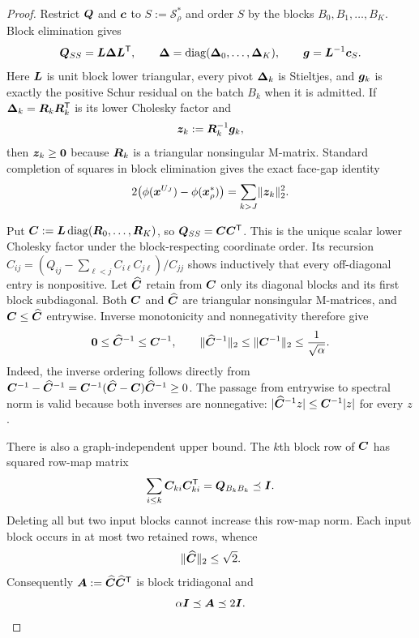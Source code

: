 \begin{proof}
Restrict $\bm{Q}$ and $\bm{c}$ to $S:=\mathcal S_\rho^*$ and order $S$ by the
blocks $B_0,B_1,\ldots,B_K$.  Block elimination gives
\begin{equation}
 \bm{Q}_{SS}=\bm{L}\bm{\Delta}\bm{L}^{\mathsf{T}},
 \qquad
 \bm{\Delta}=\operatorname{diag}(\bm{\Delta}_0,\ldots,\bm{\Delta}_K),
 \qquad
 \bm{g}=\bm{L}^{-1}\bm{c}_S.
 \label{eq:block-ldl}
\end{equation}
Here $\bm{L}$ is unit block lower triangular, every pivot
$\bm{\Delta}_k$ is Stieltjes, and $\bm{g}_k$ is exactly the positive Schur residual
on the batch $B_k$ when it is admitted.  If
$\bm{\Delta}_k=\bm{R}_k\bm{R}_k^{\mathsf{T}}$ is its lower Cholesky factor and
\begin{equation}
 \bm{z}_k:=\bm{R}_k^{-1}\bm{g}_k,
 \label{eq:block-z}
\end{equation}
then $\bm{z}_k\geq\bm{0}$ because $\bm{R}_k$ is a triangular nonsingular
M-matrix.  Standard completion of squares in block elimination gives the
exact face-gap identity
\begin{equation}
 2\bigl(\phi(\bm{x}^{U_J})-\phi(\bm{x}_\rho^*)\bigr)
 =\sum_{k>J}\lVert\bm{z}_k\rVert_2^2.
 \label{eq:block-gap-identity}
\end{equation}

Put $\bm{C}:=\bm{L}\operatorname{diag}(\bm{R}_0,\ldots,\bm{R}_K)$, so
$\bm{Q}_{SS}=\bm{C}\bm{C}^{\mathsf{T}}$.  This is the unique scalar lower Cholesky factor
under the block-respecting coordinate order.  Its recursion
$C_{ij}=(Q_{ij}-\sum_{\ell<j}C_{i\ell}C_{j\ell})/C_{jj}$ shows inductively
that every off-diagonal entry is nonpositive.  Let
$\widehat{\bm{C}}$ retain from $\bm{C}$ only its diagonal blocks and its first block
subdiagonal.  Both $\bm{C}$ and $\widehat{\bm{C}}$ are triangular nonsingular
M-matrices, and $\bm{C}\leq\widehat{\bm{C}}$ entrywise.  Inverse monotonicity and
nonnegativity therefore give
\begin{equation}
 \bm{0}\leq\widehat{\bm{C}}^{-1}\leq\bm{C}^{-1},
 \qquad
 \lVert\widehat{\bm{C}}^{-1}\rVert_2
 \leq\lVert\bm{C}^{-1}\rVert_2\leq\frac1{\sqrt\alpha}.
 \label{eq:bidiagonal-inverse-bound}
\end{equation}
Indeed, the inverse ordering follows directly from
$\bm{C}^{-1}-\widehat{\bm{C}}^{-1}
=\bm{C}^{-1}(\widehat{\bm{C}}-\bm{C})\widehat{\bm{C}}^{-1}\geq0$.
The passage from entrywise to spectral norm is valid because both inverses
are nonnegative: $|\widehat{\bm{C}}^{-1}z|\leq
\bm{C}^{-1}|z|$ for every $z$.

There is also a graph-independent upper bound.  The $k$th block row of
$\bm{C}$ has squared row-map matrix
\begin{equation}
 \sum_{i\leq k}\bm{C}_{ki}\bm{C}_{ki}^{\mathsf{T}}
 =\bm{Q}_{B_kB_k}\preceq\bm{I}.
 \label{eq:block-row-bound}
\end{equation}
Deleting all but two input blocks cannot increase this row-map norm.  Each
input block occurs in at most two retained rows, whence
\begin{equation}
 \lVert\widehat{\bm{C}}\rVert_2\leq\sqrt2.
 \label{eq:bidiagonal-upper-bound}
\end{equation}
Consequently
$\bm{A}:=\widehat{\bm{C}}\widehat{\bm{C}}^{\mathsf{T}}$ is block tridiagonal and
\begin{equation}
 \alpha\bm{I}\preceq\bm{A}\preceq2\bm{I}.
 \label{eq:block-chain-spectrum}
\end{equation}


\end{proof}
